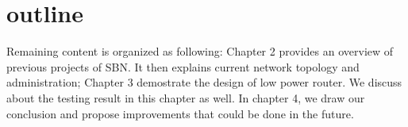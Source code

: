 \section{outline}
Remaining content is organized as following: Chapter 2 provides an overview of previous projects of SBN. It then explains current network topology and administration; Chapter 3 demostrate the design of low power router. We discuss about the testing result in this chapter as well. In chapter 4, we draw our conclusion and propose improvements that could be done in the future.
